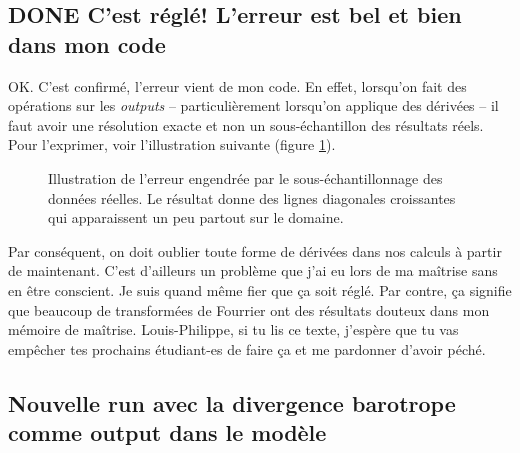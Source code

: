 \documentclass[10pt]{article}
\numberwithin{equation}{section}
\newcommand{\uu}{\vb{u}}
\newcommand{\venti}{\vphantom{\sum_x^x}}
\begin{document}
\subsection{{\bfseries\sffamily DONE} C'est réglé! L'erreur est bel et bien dans mon code}
\label{sec:org6762674}
OK. C'est confirmé, l'erreur vient de mon code.
En effet, lorsqu'on fait des opérations sur les \emph{outputs} -- particulièrement lorsqu'on applique des dérivées -- il faut avoir une résolution exacte et non un sous-échantillon des résultats réels.
Pour l'exprimer, voir l'illustration suivante (figure \ref{orgb12fd65}). \bigskip

\begin{figure}[h!]
\begin{center}
\end{center}
\caption{\label{orgb12fd65}Illustration de l'erreur engendrée par le sous-échantillonnage des données réelles. Le résultat donne des lignes diagonales croissantes qui apparaissent un peu partout sur le domaine.}
\end{figure}

Par conséquent, on doit oublier toute forme de dérivées dans nos calculs à partir de maintenant.
C'est d'ailleurs un problème que j'ai eu lors de ma maîtrise sans en être conscient.
Je suis quand même fier que ça soit réglé.
Par contre, ça signifie que beaucoup de transformées de Fourrier ont des résultats douteux dans mon mémoire de maîtrise.
Louis-Philippe, si tu lis ce texte, j'espère que tu vas empêcher tes prochains étudiant-es de faire ça et me pardonner d'avoir péché. \bigskip
\subsection{Nouvelle run avec la divergence barotrope comme output dans le modèle}
\label{sec:orgae90723}
\end{document}
